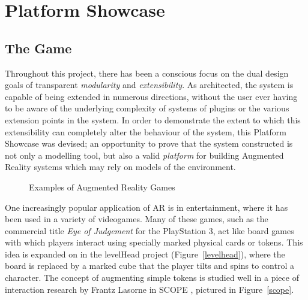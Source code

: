\documentclass[a4paper,10pt]{article}
\begin{document}
\clearpage

\section{Platform Showcase}
\subsection{The Game}
Throughout this project, there has been a conscious focus on the dual design goals of transparent \textit{modularity} and \textit{extensibility}. As architected, the system is capable of being extended in numerous directions, without the user ever having to be aware of the underlying complexity of systems of plugins or the various extension points in the system. In order to demonstrate the extent to which this extensibility can completely alter the behaviour of the system, this Platform Showcase was devised; an opportunity to prove that the system constructed is not only a modelling tool, but also a valid \textit{platform} for building Augmented Reality systems which may rely on models of the environment.

\begin{figure}[t]
    \quad
    \caption{Examples of Augmented Reality Games}
\end{figure}

One increasingly popular application of AR is in entertainment, where it has been used in a variety of videogames. Many of these games, such as the commercial title \textit{Eye of Judgement} \cite{eyeofjudgement} for the PlayStation 3, act like board games with which players interact using specially marked physical cards or tokens. This idea is expanded on in the levelHead \cite{levelhead} project (Figure~\ref{levelhead}), where the board is replaced by a marked cube that the player tilts and spins to control a character. The concept of augmenting simple tokens is studied well in a piece of interaction research by Frantz Lasorne in SCOPE \cite{scope}, pictured in Figure~\ref{scope}.
\end{document}
